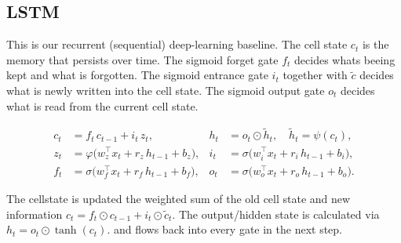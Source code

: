 




\subsection{LSTM}

\label{sec:models:lstm}


This is our recurrent (sequential) deep-learning baseline. The cell state $c_t$ is the memory that persists over time. The sigmoid forget gate $f_t$ decides whats beeing kept and what is forgotten. The sigmoid entrance gate $i_t$ together with $\tilde{c}$ decides what is newly written into the cell state. The sigmoid output gate $o_t$ decides what is read from the current cell state.




\begin{align}

  c_t &= f_t\,c_{t-1} + i_t\,z_t, &

  h_t &= o_t\odot\tilde{h}_t,\quad \tilde{h}_t=\psi(c_t), \label{eq:lstm-ch}\\

  z_t &= \varphi\!\big(w_z^\top x_t + r_z\,h_{t-1} + b_z\big), &

  i_t &= \sigma\!\big(w_i^\top x_t + r_i\,h_{t-1} + b_i\big), \label{eq:lstm-zi}\\

  f_t &= \sigma\!\big(w_f^\top x_t + r_f\,h_{t-1} + b_f\big), &

  o_t &= \sigma\!\big(w_o^\top x_t + r_o\,h_{t-1} + b_o\big). \label{eq:lstm-fo}

\end{align}


The cellstate is updated the weighted sum of the old cell state and new information $c_t = f_t\odot c_{t-1} + i_t\odot\tilde{c}_t$. The output/hidden state is calculated via $h_t = o_t\odot\tanh(c_t). \label{eq:lstm-ch}$ and flows back into every gate in the next step.\\

